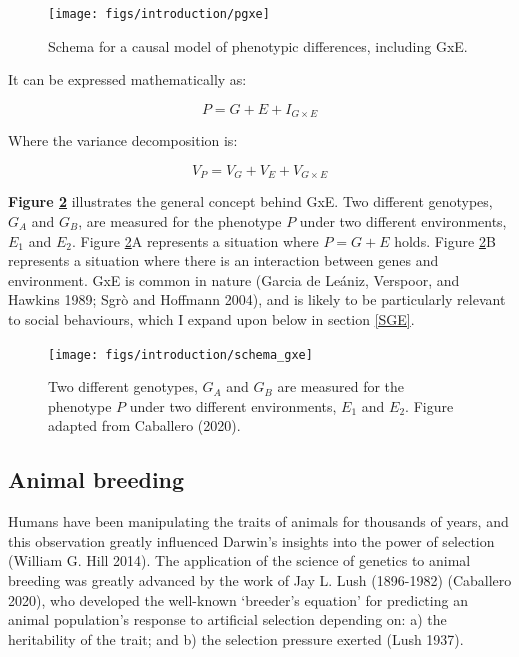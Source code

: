 \documentclass[
]{book}
\begin{document}
\begin{figure}

{\centering \texttt{[image: figs/introduction/pgxe]} 

}

\caption{Schema for a causal model of phenotypic differences, including GxE.}\label{fig:pgxe}
\end{figure}

It can be expressed mathematically as:

\begin{equation}
P = G + E + I_{G\times E} \label{eq:gbye}
\end{equation}

Where the variance decomposition is:

\begin{equation}
V_P = V_G + V_E + V_{G\times E} \label{eq:gbyedecomp}
\end{equation}

\textbf{Figure \ref{fig:schema-gxe}} illustrates the general concept behind GxE. Two different genotypes, \(G_A\) and \(G_B\), are measured for the phenotype \(P\) under two different environments, \(E_1\) and \(E_2\). Figure \ref{fig:schema-gxe}A represents a situation where \(P = G + E\) holds. Figure \ref{fig:schema-gxe}B represents a situation where there is an interaction between genes and environment. GxE is common in nature (Garcia de Leániz, Verspoor, and Hawkins 1989; Sgrò and Hoffmann 2004), and is likely to be particularly relevant to social behaviours, which I expand upon below in section \ref{SGE}.



\begin{figure}

{\centering \texttt{[image: figs/introduction/schema\_gxe]} 

}

\caption{Two different genotypes, \(G_A\) and \(G_B\) are measured for the phenotype \(P\) under two different environments, \(E_1\) and \(E_2\). Figure adapted from Caballero (2020).}\label{fig:schema-gxe}
\end{figure}

\hypertarget{animal-breeding}{%
\subsection{Animal breeding}\label{animal-breeding}}

Humans have been manipulating the traits of animals for thousands of years, and this observation greatly influenced Darwin's insights into the power of selection (William G. Hill 2014). The application of the science of genetics to animal breeding was greatly advanced by the work of Jay L. Lush (1896-1982) (Caballero 2020), who developed the well-known `breeder's equation' for predicting an animal population's response to artificial selection depending on: a) the heritability of the trait; and b) the selection pressure exerted (Lush 1937).
\end{document}
